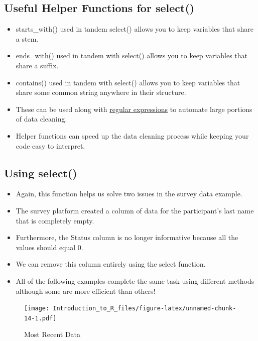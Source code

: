 \documentclass[]{book}
\providecommand{\tightlist}{%
  \setlength{\itemsep}{0pt}\setlength{\parskip}{0pt}}
\theoremstyle{definition}
\theoremstyle{definition}
\theoremstyle{definition}
\theoremstyle{remark}
\begin{document}
\hypertarget{useful-helper-functions-for-select}{%
\subsection{Useful Helper Functions for select()}\label{useful-helper-functions-for-select}}

\begin{itemize}
\tightlist
\item
  starts\_with() used in tandem select() allows you to keep variables that share a stem.
\item
  ends\_with() used in tandem with select() allows you to keep variables that share a suffix.
\item
  contains() used in tandem with select() allows you to keep variables that share some common string anywhere in their structure.
\item
  These can be used along with \href{https://cran.r-project.org/web/packages/stringr/vignettes/regular-expressions.html}{regular expressions} to automate large portions of data cleaning.
\item
  Helper functions can speed up the data cleaning process while keeping your code easy to interpret.
\end{itemize}

\hypertarget{using-select}{%
\subsection{Using select()}\label{using-select}}

\begin{itemize}
\tightlist
\item
  Again, this function helps us solve two issues in the survey data example.
\item
  The survey platform created a column of data for the participant's last name that is completely empty.
\item
  Furthermore, the Status column is no longer informative because all the values should equal 0.
\item
  We can remove this column entirely using the select function.
\item
  All of the following examples complete the same task using different methods although some are more efficient than others!
\end{itemize}

\begin{figure}
\centering
\texttt{[image: Introduction\_to\_R\_files/figure-latex/unnamed-chunk-14-1.pdf]}
\caption{\label{fig:unnamed-chunk-14}Most Recent Data}
\end{figure}
\end{document}
